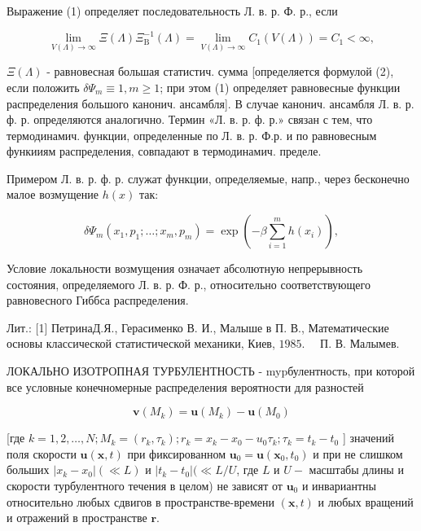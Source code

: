 \documentclass[10pt]{article}
\begin{document}
Выражение (1) определяет последовательность Л. в. р. Ф. р., если



\[

\lim _{V(\Lambda) \rightarrow \infty} \Xi(\Lambda) \Xi_{\mathrm{B}}^{-1}(\Lambda)=\lim _{V(\Lambda) \rightarrow \infty} C_{1}(V(\Lambda))=C_{1}<\infty,

\]



$\Xi(\Lambda)$ - равновесная большая статистич. сумма [определяется формулой (2), если положить $\delta \Psi_{m} \equiv 1, m \geqslant 1$; при этом (1) определяет равновесные функции распределения большого канонич. ансамбля]. В случае канонич. ансамбля Л. в. р. ф. р. определяются аналогично. Термин «Л. в. р. ф. р.» связан с тем, что термодинамич. функции, определенные по Л. в. р. Ф.р. и по равновесным функииям распределения, совпадают в термодинамич. пределе.



Примером Л. в. р. ф. р. служат функции, определяемые, напр., через бесконечно малое возмущение $h(x)$ так:



\[

\delta \Psi_{m}\left(x_{1}, p_{1} ; \ldots ; x_{m}, p_{m}\right)=\exp \left(-\beta \sum_{i=1}^{m} h\left(x_{i}\right)\right),

\]



Условие локальности возмущения означает абсолютную непрерывность состояния, определяемого Л. в. р. Ф. р., относительно соответствующего равновесного Гиббса распределения.



Лит.: [1] ПетринаД.Я., Герасименко В. И., Малыше в П. В., Математические основы классической статистической механики, Киев, $1985 . \quad$ П. В. Малымев.



ЛОКАЛЬНО ИЗОТРОПНАЯ ТУРБУЛЕНТНОСТЬ - mypбулентность, при которой все условные конечномерные распределения вероятности для разностей



\[

\boldsymbol{v}\left(M_{k}\right)=\boldsymbol{u}\left(M_{k}\right)-\boldsymbol{u}\left(M_{0}\right)

\]



[где $k=1,2, \ldots, N ; M_{k}=\left(r_{k}, \tau_{k}\right) ; r_{k}=x_{k}-x_{0}-u_{0} \tau_{k} ; \tau_{k}=t_{k}-t_{0}$ ] значений поля скорости $\boldsymbol{u}(\boldsymbol{x}, t)$ при фиксированном $\boldsymbol{u}_{0}=\boldsymbol{u}\left(\boldsymbol{x}_{0}, t_{0}\right)$ и при не слишком больших $\left|x_{k}-x_{0}\right|(\ll L)$ и $\left|t_{k}-t_{0}\right|(\ll L / U$, где $L$ и $U-$ масштабы длины и скорости турбулентного течения в целом) не зависят от $\boldsymbol{u}_{0}$ и инвариантны относительно любых сдвигов в пространстве-времени $(\boldsymbol{x}, t)$ и любых вращений и отражений в пространстве $\boldsymbol{r}$.
\end{document}

